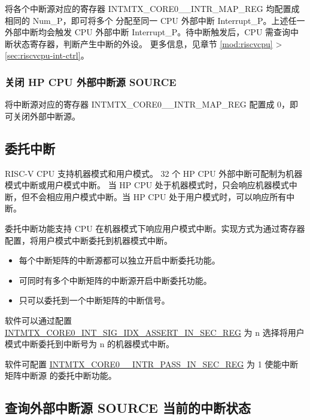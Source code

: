 \documentclass[main\_\_CN.tex]{subfiles}
\begin{document}
将各个中断源对应的寄存器 INTMTX\_CORE0\_\_INTR\_MAP\_REG 均配置成相同的 Num\_P，即可将多个  分配至同一 CPU 外部中断 Interrupt\_P。上述任一外部中断均会触发 CPU 外部中断 Interrupt\_P。待中断触发后，CPU 需查询中断状态寄存器，判断产生中断的外设。 更多信息，见章节 \ref{mod:riscvcpu} \textit{} >  \ref{sec:riscvcpu-int-ctrl}\textit{}。

\subsubsection{关闭 HP CPU 外部中断源 SOURCE}

将中断源对应的寄存器 INTMTX\_CORE0\_\_INTR\_MAP\_REG 配置成 0，即可关闭外部中断源。


\subsection{委托中断}
\chipname{} RISC-V CPU 支持机器模式和用户模式。 32 个 HP CPU 外部中断可配制为机器模式中断或用户模式中断。 当 HP CPU 处于机器模式时，只会响应机器模式中断，但不会相应用户模式中断。当 HP CPU 处于用户模式时，可以响应所有中断。


委托中断功能支持 CPU 在机器模式下响应用户模式中断。实现方式为通过寄存器配置，将用户模式中断委托到机器模式中断。

\begin{itemize}

    \item 每个中断矩阵的中断源都可以独立开启中断委托功能。
    \item 可同时有多个中断矩阵的中断源开启中断委托功能。
    \item 只可以委托到一个中断矩阵的中断信号。

\end{itemize}

软件可以通过配置 \hyperref[regdesc:INTMTXCORE0INTSIGIDXASSERTINSECREG]{INTMTX\_CORE0\_INT\_SIG\_IDX\_ASSERT\_IN\_SEC\_REG} 为 n 选择将用户模式中断委托到中断号为 n 的机器模式中断。

软件可配置 \hyperref[INTMTXCORE0SOURCEINTRMAPREG]{INTMTX\_CORE0\_\_INTR\_PASS\_IN\_SEC\_REG} 为 1 使能中断矩阵中断源  的委托中断功能。

\subsection{查询外部中断源 SOURCE 当前的中断状态}
\end{document}
